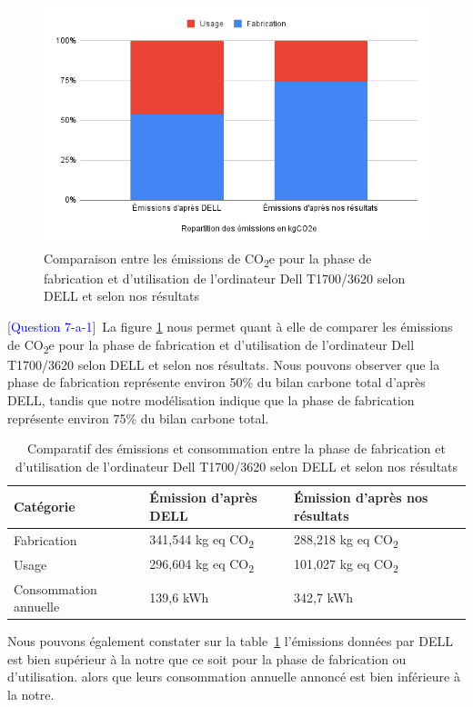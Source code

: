 \documentclass[12pt,a4paper]{paper}
\begin{document}
\begin{figure}[H]%
    \centering
    \includegraphics[width=\linewidth]{img/graph-frabr-usage-dell-vs-us.png}
    \caption{Comparaison entre les émissions de CO\textsubscript{2}e pour la phase de fabrication et d'utilisation de l'ordinateur Dell T1700/3620 selon DELL et selon nos résultats}
    \label{fig:fab-impact}
\end{figure}

\textcolor{blue}{[Question 7-a-1]}~La figure \ref{fig:fab-impact} nous permet quant à elle de comparer les émissions de CO\textsubscript{2}e pour la phase de fabrication et d'utilisation de l'ordinateur Dell T1700/3620 selon DELL et selon nos résultats. Nous pouvons observer que la phase de fabrication représente environ 50\% du bilan carbone total d'après DELL, tandis que notre modélisation indique que la phase de fabrication représente environ 75\% du bilan carbone total.\\
\begin{table}[H]
    \centering
    \begin{tabular}{|p{2.5cm}|p{2.5cm}|p{2.5cm}|}
    \hline
    \textbf{Catégorie} & \textbf{Émission d'après DELL} & \textbf{Émission d'après nos résultats} \\
    \hline
    Fabrication & 341{,}544 kg eq CO\textsubscript{2} & 288{,}218 kg eq CO\textsubscript{2} \\ \hline
    Usage & 296{,}604 kg eq CO\textsubscript{2} & 101{,}027 kg eq CO\textsubscript{2} \\ \hline
    Consommation annuelle & 139{,}6 kWh & 342{,}7 kWh \\
    \hline
    \end{tabular}
    \caption{Comparatif des émissions et consommation entre la phase de fabrication et d'utilisation de l'ordinateur Dell T1700/3620 selon DELL et selon nos résultats}
    \label{tab:comparatif}
\end{table}
Nous pouvons également constater sur la table~\ref{tab:comparatif} l'émissions données par DELL est bien supérieur à la notre que ce soit pour la phase de fabrication ou d'utilisation. alors que leurs consommation annuelle annoncé est bien inférieure à la notre.
\end{document}
